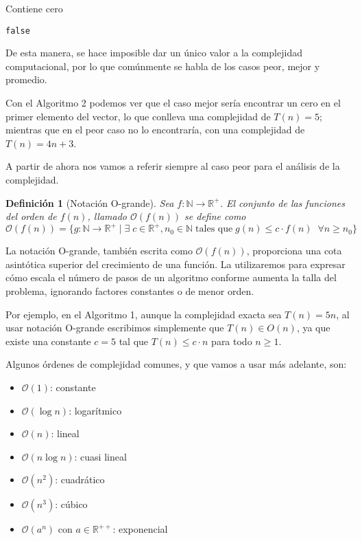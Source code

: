 \documentclass[12pt,twoside]{article}
\newtheorem{definition}[theorem]{Definición}
\begin{document}
\begin{algorithm}
\DontPrintSemicolon
\SetAlgoLined
\caption{Contiene cero}
\Return \texttt{false}
\end{algorithm}


De esta manera, se hace imposible dar un único valor a la complejidad computacional, por lo que comúnmente se habla de los casos peor, mejor y promedio.

Con el Algoritmo 2 podemos ver que el caso mejor sería encontrar un cero en el primer elemento del vector, lo que conlleva una complejidad de $T(n)=5$; mientras que en el peor caso no lo encontraría, con una complejidad de $T(n)=4n+3$.

A partir de ahora nos vamos a referir siempre al caso peor para el análisis de la complejidad.

\begin{definition}[Notación O-grande]
Sea $f:\mathbb{N}\rightarrow\mathbb{R}^{+}$. El conjunto de las funciones del orden de $f(n)$, llamado $\mathcal{O}(f(n))$ se define como $$\mathcal{O}(f(n))=\{g:\mathbb{N}\rightarrow\mathbb{R}^{+}\mid\exists \;c\in\mathbb{R}^{+},n_{0}\in\mathbb{N}\; \text{tales que}\; g(n)\leq c\cdot f(n)\;\;\forall n\geq n_{0}\}$$
\end{definition}

La notación O-grande, también escrita como $\mathcal{O}(f(n))$, proporciona una cota asintótica superior del crecimiento de una función. La utilizaremos para expresar cómo escala el número de pasos de un algoritmo conforme aumenta la talla del problema, ignorando factores constantes o de menor orden.

Por ejemplo, en el Algoritmo 1, aunque la complejidad exacta sea $T(n) = 5n$, al usar notación O-grande escribimos simplemente que $T(n) \in O(n)$, ya que existe una constante $c=5$ tal que $T(n) \leq c \cdot n$ para todo $n \geq 1$.

Algunos órdenes de complejidad comunes, y que vamos a usar más adelante, son:
\begin{itemize}
    \item $\mathcal{O}(1)$: constante
    \item $\mathcal{O}(\log n)$: logarítmico
    \item $\mathcal{O}(n)$: lineal
    \item $\mathcal{O}(n\log n)$: cuasi lineal
    \item $\mathcal{O}(n^2)$: cuadrático
    \item $\mathcal{O}(n^3)$: cúbico
    \item $\mathcal{O}(a^n)$ con $a\in\mathbb{R}^{++}$: exponencial
\end{itemize}
\end{document}
